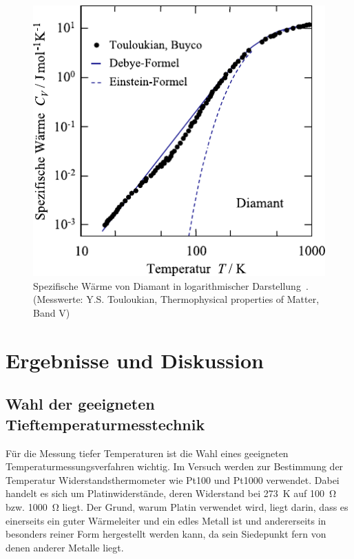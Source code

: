 \documentclass[parskip=half, a4paper,twoside,final]{article}
\begin{document}
\begin{figure}[htp]
  \centering
  \includegraphics{Bilder/Debye_Einstein.pdf}
  \caption{Spezifische Wärme von Diamant in logarithmischer Darstellung~\cite{Hunklinger}. (Messwerte: Y.S. Touloukian, Thermophysical properties of Matter, Band V)}
  \label{fig:Debye_Einstein}
\end{figure}




\newpage
\section{Ergebnisse und Diskussion}\label{sec:ErgebnisseUndDiskussion}

\subsection{Wahl der geeigneten Tieftemperaturmesstechnik}
Für die Messung tiefer Temperaturen ist die Wahl eines geeigneten Temperaturmessungsverfahren wichtig. Im Versuch werden zur Bestimmung der Temperatur Widerstandsthermometer wie Pt100 und Pt1000 verwendet. Dabei handelt es sich um Platinwiderstände, deren Widerstand bei \SI{273}{\kelvin} auf \SI{100}{\ohm} bzw. \SI{1000}{\ohm} liegt. Der Grund, warum Platin verwendet wird, liegt darin, dass es einerseits ein guter Wärmeleiter und ein edles Metall ist und andererseits in besonders reiner Form hergestellt werden kann, da sein Siedepunkt fern von denen anderer Metalle liegt.
\end{document}
